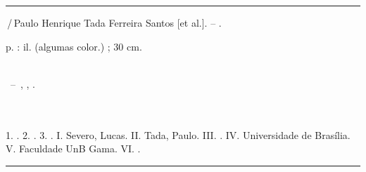 \begin{fichacatalografica}
	\vspace*{\fill}					%
	\hrule							%
	\begin{center}					%
	\begin{minipage}[c]{12.5cm}		%

	\imprimirautorunico

	\hspace{0.5cm} \imprimirtitulo\,/\,Paulo Henrique Tada Ferreira Santos [et al.]. -- \imprimirdata.

	\hspace{0.5cm} \pageref{LastPage} p. : il. (algumas color.) ; 30 cm.\\

	\hspace{0.5cm} \imprimirorientadorRotulo~\imprimirorientador\\

	\hspace{0.5cm}
	\parbox[t]{\textwidth}{\imprimirtipotrabalho~--~\imprimirinstituicao, \imprimirlocal, \imprimirdata.}\\\\

	\hspace{0.5cm}
		1. \imprimirpalavrachaveum.
		2. \imprimirpalavrachavedois.
		3. \imprimirpalavrachavetres.
		I. Severo, Lucas.
		II. Tada, Paulo.
		III. \imprimirorientador.
		IV. Universidade de Brasília.
		V. Faculdade UnB Gama.
		VI. \imprimirtitulo.\\
	\end{minipage}
	\end{center}
	\hrule
\end{fichacatalografica}
\clearpage
